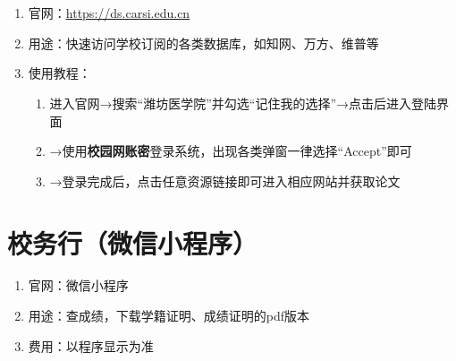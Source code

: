 \section[CARSI系统]{\textbf{}}
\label{carsi_system}
\begin{enumerate}
    \item 官网：\uline{\href{https://ds.carsi.edu.cn}{https://ds.carsi.edu.cn}}
    \item 用途：快速访问学校订阅的各类数据库，如知网、万方、维普等
    \item 使用教程：
          \begin{enumerate}[（1）]
              \item 进入官网→搜索“潍坊医学院”并勾选“记住我的选择”→点击后进入登陆界面\footnotemark
              \item →使用\textbf{校园网账密}登录系统，出现各类弹窗一律选择“Accept”即可\footnotemark
              \item →登录完成后，点击任意资源链接即可进入相应网站并获取论文
          \end{enumerate}
\end{enumerate}

\section[校务行（微信小程序）]{校务行（微信小程序）}
\begin{enumerate}
    \item 官网：微信小程序
    \item 用途：查成绩，下载学籍证明、成绩证明的pdf版本
    \item 费用：以程序显示为准
\end{enumerate}

